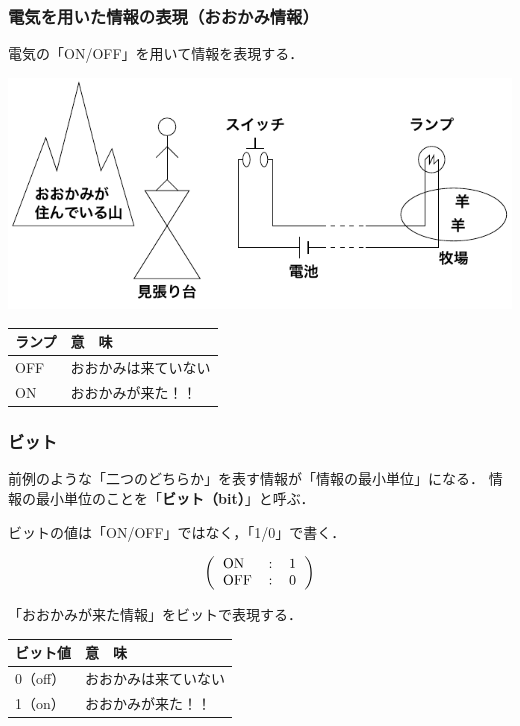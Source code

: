 \documentclass{beamer}                 %
\begin{document}
\begin{frame}
  \frametitle{電気を用いた情報の表現（おおかみ情報）}
  電気の「ON/OFF」を用いて情報を表現する．
  \begin{center}
    \includegraphics[scale=0.8]{../Tikz/ookami.pdf}
  \end{center}
  \begin{center}
    \begin{tabular}{l | l}\hline\hline
      ランプ  &  意　味 \\\hline
      OFF     & おおかみは来ていない \\
      ON      & おおかみが来た！！
    \end{tabular}
  \end{center}
\end{frame}

\begin{frame}
  \frametitle{ビット}
  前例のような「二つのどちらか」を表す情報が「情報の最小単位」になる．
  情報の最小単位のことを「{\bf ビット（bit）}」と呼ぶ．

\begin{center}
\end{center}

ビットの値は「ON/OFF」ではなく，「1/0」で書く．
\begin{center}
{\small\[\left(\begin{tabular}{l c l}
ON  & : & 1 \\
OFF & : & 0
\end{tabular}\right)\]}
\end{center}

「おおかみが来た情報」をビットで表現する．
  \begin{center}
    \begin{tabular}{l | l}\hline\hline
      ビット値  &  意　味 \\\hline
      0（off）  & おおかみは来ていない \\
      1（on）   & おおかみが来た！！
    \end{tabular}
  \end{center}

\end{frame}
\end{document}
